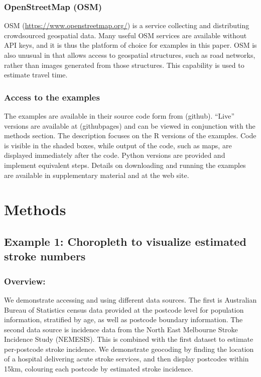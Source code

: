 \documentclass[utf8]{frontiersHLTH}
\begin{document}
\subsubsection{OpenStreetMap (OSM)}\label{openstreetmap-osm}

OSM (\url{https://www.openstreetmap.org/}) is a service collecting and
distributing crowdsourced geospatial data. Many useful OSM services are
available without API keys, and it is thus the platform of choice for
examples in this paper. OSM is also unusual in that allows access to
geospatial structures, such as road networks, rather than images
generated from those structures. This capability is used to estimate
travel time.

\subsubsection{Access to the examples}\label{access-to-the-examples}

The examples are available in their source code form from (github).
``Live'' versions are available at (githubpages) and can be viewed in
conjunction with the methods section. The description focuses on the R
versions of the examples. Code is visible in the shaded boxes, while
output of the code, such as maps, are displayed immediately after the
code. Python versions are provided and implement equivalent steps.
Details on downloading and running the examples are available in
supplementary material and at the web site.

\section{Methods}\label{methods}

\subsection{Example 1: Choropleth to visualize estimated stroke
numbers}\label{example-1-choropleth-to-visualize-estimated-stroke-numbers}

\subsubsection{Overview:}\label{overview}

We demonstrate accessing and using different data sources. The first is
Australian Bureau of Statistics census data provided at the postcode
level for population information, stratified by age, as well as postcode
boundary information. The second data source is incidence data from the
North East Melbourne Stroke Incidence Study (NEMESIS)\cite{thrift_stroke_2000}. This is combined
with the first dataset to estimate per-postcode stroke incidence. We
demonstrate geocoding by finding the location of a hospital delivering
acute stroke services, and then display postcodes within 15km, colouring
each postcode by estimated stroke incidence.
\end{document}
